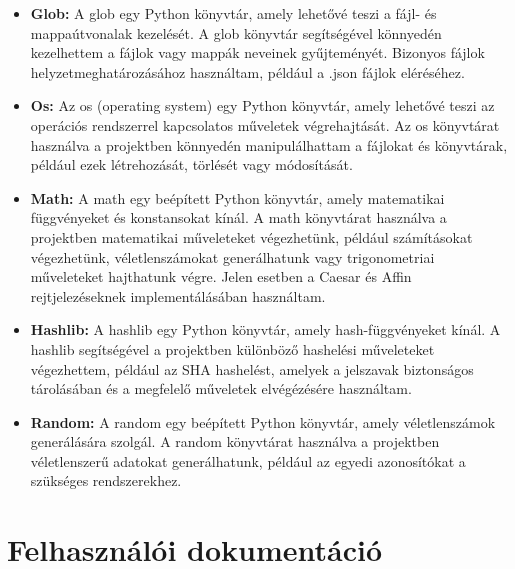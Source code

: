 \begin{itemize}
 	 \item\textbf{Glob:}
A glob egy Python könyvtár, amely lehetővé teszi a fájl- és mappaútvonalak kezelését. A glob könyvtár segítségével könnyedén kezelhettem a fájlok vagy mappák neveinek gyűjteményét. Bizonyos fájlok helyzetmeghatározásához használtam, például a .json fájlok eléréséhez.

 	 \item\textbf{Os:}
Az os (operating system) egy Python könyvtár, amely lehetővé teszi az operációs rendszerrel kapcsolatos műveletek végrehajtását. Az os könyvtárat használva a projektben könnyedén manipulálhattam a fájlokat és könyvtárak, például ezek létrehozását, törlését vagy módosítását.

 	 \item\textbf{Math:}
A math egy beépített Python könyvtár, amely matematikai függvényeket és konstansokat kínál. A math könyvtárat használva a projektben matematikai műveleteket végezhetünk, például számításokat végezhetünk, véletlenszámokat generálhatunk vagy trigonometriai műveleteket hajthatunk végre. Jelen esetben a Caesar és Affin rejtjelezéseknek implementálásában használtam.

 	 \item\textbf{Hashlib:}
A hashlib egy Python könyvtár, amely hash-függvényeket kínál. A hashlib segítségével a projektben különböző hashelési műveleteket végezhettem, például az SHA hashelést, amelyek a jelszavak biztonságos tárolásában és a megfelelő műveletek elvégézésére használtam.

 	 \item\textbf{Random:}
A random egy beépített Python könyvtár, amely véletlenszámok generálására szolgál. A random könyvtárat használva a projektben véletlenszerű adatokat generálhatunk, például az egyedi azonosítókat a szükséges rendszerekhez.

\end{itemize}


\section {Felhasználói dokumentáció}
